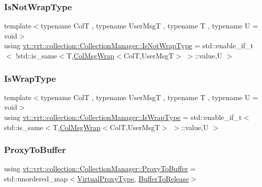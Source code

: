 \subsubsection{\texorpdfstring{Is\+Not\+Wrap\+Type}{IsNotWrapType}}
{\footnotesize\ttfamily template$<$typename ColT , typename User\+MsgT , typename T , typename U  = void$>$ \\
using \hyperlink{structvt_1_1vrt_1_1collection_1_1_collection_manager_a18e3a17d9eb086c6c2f499242b7faa1e}{vt\+::vrt\+::collection\+::\+Collection\+Manager\+::\+Is\+Not\+Wrap\+Type} =  std\+::enable\+\_\+if\+\_\+t$<$ !std\+::is\+\_\+same$<$T,\hyperlink{structvt_1_1vrt_1_1collection_1_1_col_msg_wrap}{Col\+Msg\+Wrap}$<$ColT,User\+MsgT$>$ $>$\+::value,U $>$}

\mbox{\label{structvt_1_1vrt_1_1collection_1_1_collection_manager_a1f91c97ed52237c3a3576dfbbe87c8f8}} 
\subsubsection{\texorpdfstring{Is\+Wrap\+Type}{IsWrapType}}
{\footnotesize\ttfamily template$<$typename ColT , typename User\+MsgT , typename T , typename U  = void$>$ \\
using \hyperlink{structvt_1_1vrt_1_1collection_1_1_collection_manager_a1f91c97ed52237c3a3576dfbbe87c8f8}{vt\+::vrt\+::collection\+::\+Collection\+Manager\+::\+Is\+Wrap\+Type} =  std\+::enable\+\_\+if\+\_\+t$<$ std\+::is\+\_\+same$<$T,\hyperlink{structvt_1_1vrt_1_1collection_1_1_col_msg_wrap}{Col\+Msg\+Wrap}$<$ColT,User\+MsgT$>$ $>$\+::value,U $>$}

\mbox{\label{structvt_1_1vrt_1_1collection_1_1_collection_manager_a8229b3026c5790ed0783bd34c404e359}} 
\subsubsection{\texorpdfstring{Proxy\+To\+Buffer}{ProxyToBuffer}}
{\footnotesize\ttfamily using \hyperlink{structvt_1_1vrt_1_1collection_1_1_collection_manager_a8229b3026c5790ed0783bd34c404e359}{vt\+::vrt\+::collection\+::\+Collection\+Manager\+::\+Proxy\+To\+Buffer} =  std\+::unordered\+\_\+map$<$\hyperlink{namespacevt_a1b417dd5d684f045bb58a0ede70045ac}{Virtual\+Proxy\+Type}, \hyperlink{structvt_1_1vrt_1_1collection_1_1_collection_manager_a47d2def9bdf4fb84026c615602779053}{Buffer\+To\+Release}$>$\hspace{0.3cm}{\ttfamily [private]}}

